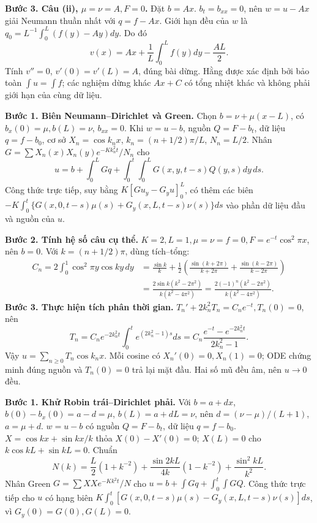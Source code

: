 \textbf{Bước 3. Câu (ii), $\mu=\nu=A,F=0$.}
Đặt $b=Ax$. $b_t=b_{xx}=0$, nên $w=u-Ax$ giải Neumann thuần nhất với $q=f-Ax$. Giới hạn đều của $w$ là $q_0=L^{-1}\int_0^L(f(y)-Ay)dy$. Do đó
\[v(x)=Ax+\frac1L\int_0^Lf(y)dy-\frac{AL}2.\]
Tính $v''=0$, $v'(0)=v'(L)=A$, đúng bài dừng. Hằng được xác định bởi bảo toàn $\int u=\int f$; các nghiệm dừng khác $Ax+C$ có tổng nhiệt khác và không phải giới hạn của cùng dữ liệu.

\textbf{Bước 1. Biên Neumann–Dirichlet và Green.}
Chọn $b=\nu+\mu(x-L)$, có $b_x(0)=\mu,b(L)=\nu$, $b_{xx}=0$. Khi $w=u-b$, nguồn $Q=F-b_t$, dữ liệu $q=f-b_0$, cơ sở $X_n=\cos k_nx$, $k_n=(n+1/2)\pi/L$, $N_n=L/2$. Nhân $G=\sum X_n(x)X_n(y)e^{-Kk_n^2t}/N_n$ cho
\[u=b+\int_0^LGq+\int_0^t\!\int_0^LG(x,y,t-s)Q(y,s)dy\,ds.\]
Công thức trực tiếp, suy bằng $K[Gu_y-G_yu]_0^L$, có thêm các biên $-K\int_0^t\{G(x,0,t-s)\mu(s)+G_y(x,L,t-s)\nu(s)\}ds$ vào phần dữ liệu đầu và nguồn của $u$.

\textbf{Bước 2. Tính hệ số câu cụ thể.}
$K=2,L=1,\mu=\nu=f=0,F=e^{-t}\cos^2\pi x$, nên $b=0$. Với $k=(n+1/2)\pi$, dùng tích–tổng:
\begin{align*}
C_n=2\int_0^1\cos^2\pi y\cos ky\,dy
&=\frac{\sin k}k+\frac12\left(\frac{\sin(k+2\pi)}{k+2\pi}
+\frac{\sin(k-2\pi)}{k-2\pi}\right)\\
&=\frac{2\sin k(k^2-2\pi^2)}{k(k^2-4\pi^2)}
=\frac{2(-1)^n(k^2-2\pi^2)}{k(k^2-4\pi^2)}.
\end{align*}
\textbf{Bước 3. Thực hiện tích phân thời gian.}
$T_n'+2k_n^2T_n=C_ne^{-t},T_n(0)=0$, nên
\[T_n=C_ne^{-2k_n^2t}\int_0^te^{(2k_n^2-1)s}ds
=C_n\frac{e^{-t}-e^{-2k_n^2t}}{2k_n^2-1}.\]
Vậy $u=\sum_{n\ge0}T_n\cos k_nx$. Mỗi cosine có $X_n'(0)=0,X_n(1)=0$; ODE chứng minh đúng nguồn và $T_n(0)=0$ trả lại mặt đầu. Hai số mũ đều âm, nên $u\to0$ đều.

\textbf{Bước 1. Khử Robin trái–Dirichlet phải.}
Với $b=a+dx$, $b(0)-b_x(0)=a-d=\mu$, $b(L)=a+dL=\nu$, nên $d=(\nu-\mu)/(L+1)$, $a=\mu+d$. $w=u-b$ có nguồn $Q=F-b_t$, dữ liệu $q=f-b_0$.
$X=\cos kx+\sin kx/k$ thỏa $X(0)-X'(0)=0$; $X(L)=0$ cho $k\cos kL+\sin kL=0$. Chuẩn
\[N(k)=\frac L2(1+k^{-2})+\frac{\sin2kL}{4k}(1-k^{-2})+\frac{\sin^2kL}{k^2}.\]
Nhân Green $G=\sum XXe^{-Kk^2t}/N$ cho $u=b+\int Gq+\int_0^t\int GQ$. Công thức trực tiếp cho $u$ có hạng biên $K\int_0^t[G(x,0,t-s)\mu(s)-G_y(x,L,t-s)\nu(s)]ds$, vì $G_y(0)=G(0),G(L)=0$.


